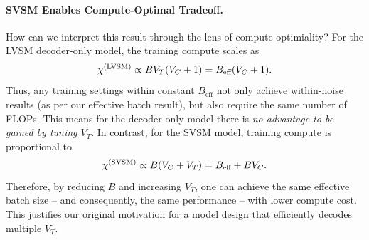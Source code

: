\paragraph{SVSM Enables Compute-Optimal Tradeoff.}
%
How can we interpret this result through the lens of compute-optimiality? For the LVSM decoder-only model, the training compute scales as 
\begin{equation}
    \chi{}^{\text{(LVSM)}} \propto B V_T (V_C + 1) = B_{\text{eff}}(V_C + 1).
\end{equation}
Thus, any training settings within constant $B_{\text{eff}}$ not only achieve within-noise results (as per our effective batch result), but also require the same number of FLOPs. This means for the decoder-only model there is \emph{no advantage to be gained by tuning $V_T$}. In contrast, for the SVSM model, training compute is proportional to
\begin{equation}
    \chi{}^{\text{(SVSM)}} \propto B(V_C + V_T) = B_{\text{eff}} + BV_C.
\end{equation}
Therefore, by reducing $B$ and increasing $V_T$, one can achieve the same effective batch size -- and consequently, the same performance -- with lower compute cost. This justifies our original motivation for a model design that efficiently decodes multiple $V_T$.



%


%





